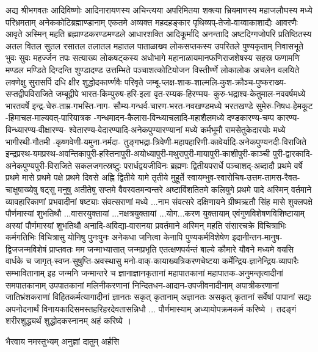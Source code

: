 अद्य श्रीभगवतः आदिविष्णोः आदिनारायणस्य अचिन्त्यया अपरिमितया शक्त्या भ्रियमाणस्य महाजलौघस्य मध्ये परिभ्रमताम् अनेककोटिब्रह्माण्डानाम् एकतमे अव्यक्त महदहङ्कार पृथिव्यप्-तेजो-वाय्वाकाशाद्यैः आवरणैः आवृते अस्मिन् महति ब्रह्माण्डकरण्डमण्डले आधारशक्ति आदिकूर्मादि अनन्तादि अष्टदिग्गजोपरि प्रतिष्ठितस्य अतल वितल सुतल रसातल तलातल महातल पाताळाख्य लोकसप्तकस्य उपरितले पुण्यकृताम् निवासभूते भुवः सुवः महर्ज्जन तपः सत्याख्य लोकषट्कस्य अधोभागे महानाळायमानफणिराजशेषस्य सहस्र फणामणि मण्डल मण्डिते दिग्दन्ति शुण्डादण्ड उत्तम्भिते पञ्चाशत्कोटियोजन विस्तीर्ण्णे लोकालोक अचलेन वलयिते लवणेक्षु सुरासर्पि दधि क्षीर शुद्धोदकार्ण्णवैः परिवृते जम्बू-प्लक्ष-शाक-शाल्मलि-कुश-क्रौञ्च-पुष्कराख्य-सप्तद्वीपविराजिते जम्बूद्वीपे भारत-किम्पुरुष-हरि-इला वृत-रम्यक-हिरण्मय- कुरु-भद्राश्व-केतुमाल-नववर्षमध्ये भारतवर्षे इन्द्र-चेरु-ताम्र-गभस्ति-नाग- सौम्य-गन्धर्व-चारण-भरत-नवखण्डमध्ये भरतखण्डे सुमेरु-निषध-हेमकूट -हिमाचल-माल्यवत्-पारियात्रक -गन्धमादन-कैलास-विन्ध्याचलादि-महाशैलमध्ये दण्डकारण्य-चम्प कारण्य-विन्ध्यारण्य-वीक्षारण्य- श्वेतारण्य-वेदारण्यादि-अनेकपुण्यारण्यानां मध्ये कर्मभूमौ रामसेतुकेदारयोः मध्ये भागीरथी-गौतमी -कृष्णवेणी-यमुना-नर्मदा- तुङ्गभद्रा-त्रिवेणी-महापहारिणी-कावेर्यादि-अनेकपुण्यनदी-विराजिते इन्द्रप्रस्थ-यमप्रस्थ-अवन्तिकापुरी-हस्तिनापुरी-अयोध्यापुरी-मथुरापुरी-मायापुरी-काशीपुरी-काञ्ची पुरी-द्वारकादि- अनेकपुण्यपुरी-विराजिते     सकलजगत्स्रष्टुः परार्धद्वयजीविनः ब्रह्मणः द्वितीयपरार्धे पञ्चाशद्-अब्दादौ प्रथमे वर्षे प्रथमे मासे प्रथमे पक्षे प्रथमे दिवसे अह्नि द्वितीये यामे तृतीये मुहूर्ते स्वायम्भुव-स्वारोचिष-उत्तम-तामस-रैवत-चाक्षुषाख्येषु षट्सु मनुषु अतीतेषु सप्तमे वैवस्वतमन्वन्तरे अष्टाविंशतितमे कलियुगे प्रथमे पादे अस्मिन् वर्तमाने व्यावहारिकाणां प्रभवादीनां षष्ट्याः संवत्सराणां मध्ये ...नाम संवत्सरे दक्षिणायने ग्रीष्मऋतौ सिंह मासे शुक्लपक्षे पौर्णमास्यां शुभतिथौ ...वासरयुक्तायां ...नक्षत्रयुक्तायां ...योग...करण युक्तायाम् एवंगुणविशेषणविशिष्टायाम् अस्यां पौर्णमास्यां शुभतिथौ 
    अनादि-अविद्या-वासनया प्रवर्तमाने अस्मिन् महति संसारचक्रे विचित्राभिः कर्मगतिभिः विचित्रासु योनिषु पुनःपुनः अनेकधा जनित्वा केनापि पुण्यकर्मविशेषेण इदानीन्तन-मानुष-द्विजजन्मविशेषं प्राप्तवतः मम जन्माभ्यासात् जन्मप्रभृति एतत्क्षणपर्यन्तं बाल्ये कौमारे यौवने मध्यमे वयसि वार्धके च जागृत्-स्वप्न-सुषुप्ति-अवस्थासु मनो-वाक्-कायाख्यत्रिकरणचेष्टया कर्मेन्द्रिय-ज्ञानेन्द्रिय-व्यापारैः सम्भावितानाम् इह जन्मनि जन्मान्तरे च ज्ञानाज्ञानकृतानां महापातकानां महापातक-अनुमन्तृत्वादीनां समपातकानाम् उपपातकानां मलिनीकरणानां निन्दितधन-आदान-उपजीवनादीनाम् अपात्रीकरणानां जातिभ्रंशकराणां विहितकर्मत्यागादीनां ज्ञानतः सकृत् कृतानाम् अज्ञानतः असकृत् कृतानां सर्वेषां पापानां सद्यः अपनोदनार्थं  
    विनायकादिसमस्तहरिहरदेवतासन्निधौ ... पौर्णमास्याम् अध्यायोपक्रमकर्म करिष्ये । 
    तदङ्गं शरीरशुद्ध्यर्थं शुद्धोदकस्नानम् अहं करिष्ये ।
    
     {भैरवाय नमस्तुभ्यम् अनुज्ञां दातुम् अर्हसि}

    




